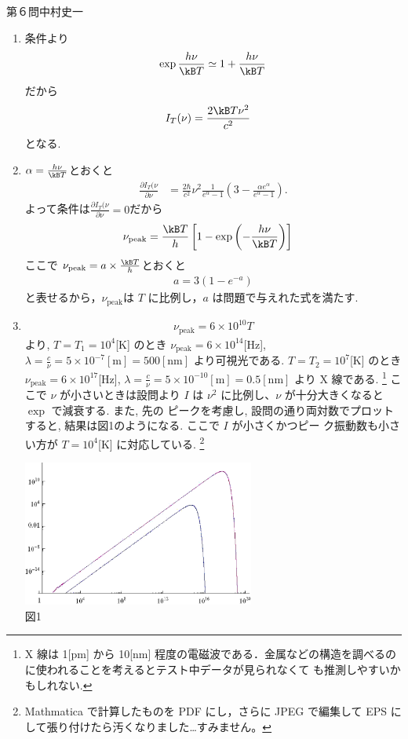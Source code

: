 \begin{answer}{第６問}{中村史一}
\def\npeak{\nu_\mathrm{peak}}
\begin{enumerate}
\item{}
  条件より
  \begin{align}
    \exp\frac{h\nu}{\kB T} \simeq 1 + \frac{h\nu}{\kB T}
  \end{align}
  だから
  \begin{align}
    I_T(\nu) &= \frac{2\kB T \nu^2}{c^2}
  \end{align}
  となる.
\item
  $\alpha=\frac{h\nu}{\kB T}$とおくと
  \begin{align}
    \frac{\partial I_T(\nu}{\partial\nu} &= \frac{2\hbar}{c^2} \nu^2\frac1{e^\alpha-1} \left(3-\frac{\alpha e^\alpha}{e^\alpha -1}\right).
  \end{align}
  よって条件は$\frac{\partial I_T(\nu}{\partial\nu}=0$だから
  \begin{align}
    \npeak &= \frac{\kB T}h \left[1-\exp\left(-\frac{h\nu}{\kB T}\right)\right]
  \end{align}
  ここで $\npeak=a\times\frac{\kB T}h$とおくと
  \begin{align}
    a=3(1-e^{-a})
  \end{align}
  と表せるから，$\npeak$は $T$ に比例し，$a$ は問題で与えれた式を満たす.
\item
  \begin{align}
    \npeak = 6\times10^{10} T
  \end{align}
  より, $T=T_1=10^4$[K] のとき $\npeak=6\times10^{14}$[Hz],
  $\lambda=\frac c\nu = 5\times10^{-7}[\mathrm{m}]=500[\mathrm{nm}]$
  より可視光である.
  $T=T_2=10^7$[K] のとき $\npeak=6\times10^{17}$[Hz],
  $\lambda=\frac c\nu=5\times10^{-10}[\mathrm{m}]=0.5[\mathrm{nm}]$ より X 線である.
  \footnote{X 線は 1[pm] から 10[nm] 程度の電磁波である．金属などの構造を調べるのに使われることを考えるとテスト中データが見られなくて
  も推測しやすいかもしれない.}
  ここで $\nu$ が小さいときは設問より $I$ は $\nu^2$ に比例し、$\nu$ が十分大きくなると $\exp$ で減衰する. また, 先の
  ピークを考慮し, 設問の通り両対数でプロットすると, 結果は図1のようになる. ここで $I$ が小さくかつピー
  ク振動数も小さい方が $T = 10^4$[K] に対応している.
  \footnote{Mathmatica で計算したものを PDF にし，さらに JPEG で編集して EPS にして張り付けたら汚くなりました…すみません。}
  \begin{center}
    \includegraphics[width=0.6\textwidth]{2007physA6_1r.eps}\\図1

\end{center}
\end{enumerate}
\end{answer}
